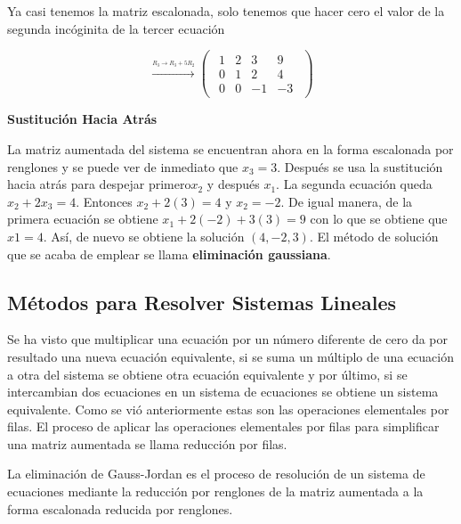 \documentclass{article}
\begin{document}
Ya casi tenemos la matriz escalonada, solo tenemos que hacer cero el valor de la segunda incóginita de la tercer ecuación

\begin{equation*}
    \xrightarrow{\overset{R_3 \rightarrow R_3 + 5R_2}{}} 
    \begin{pmatrix}
        \begin{array}{rrr|r}
            1 & 2 & 3 & 9\\
            0 & 1 & 2 & 4 \\
            0 & 0 &-1 &-3
        \end{array}
    \end{pmatrix}
\end{equation*}

\begin{large}
    \textbf{Sustitución Hacia Atrás}
\end{large}

La matriz aumentada del sistema se encuentran ahora en la forma escalonada por renglones y se puede ver de inmediato que $x_3 = 3$. Después se usa la sustitución hacia atrás para despejar primero$x_2$ y después $x_1$. La segunda ecuación queda $x_2 + 2x_3 = 4$. Entonces $x_2 + 2(3) = 4$ y $x_2 =-2$. De igual manera, de la primera ecuación se obtiene $x_1 + 2(-2) + 3(3) = 9$  con lo que se obtiene que $x1 = 4$. Así, de nuevo se obtiene la solución $(4, -2, 3)$. El método de solución que se acaba de emplear se llama \textbf{eliminación gaussiana}.

\subsection{Métodos para Resolver Sistemas Lineales}

Se ha visto que multiplicar una ecuación por un número diferente de cero da por resultado una nueva ecuación equivalente, si se suma un múltiplo de una ecuación a otra del sistema se obtiene otra ecuación equivalente y por último, si se intercambian dos ecuaciones en un sistema de ecuaciones se obtiene un sistema equivalente. Como se vió anteriormente estas son las operaciones elementales por filas. El proceso de aplicar las operaciones elementales por filas para simplificar una matriz aumentada se llama reducción por filas. 

La eliminación de Gauss-Jordan es el proceso de resolución de un sistema de ecuaciones mediante la reducción por renglones de la matriz aumentada a la forma escalonada reducida por renglones.
\end{document}
